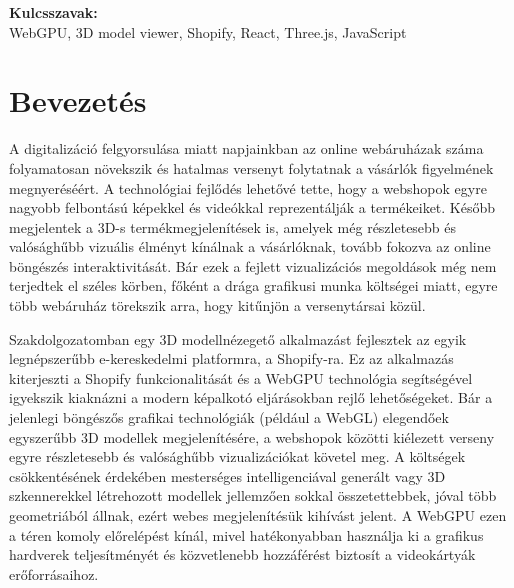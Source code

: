 \documentclass[12pt]{report}
\newcommand{\tartalmi}[1]{%
  \vspace{1em}%
  \noindent\textbf{#1:}\\%
}
\begin{document}
        \tartalmi{Kulcsszavak}
        WebGPU, 3D model viewer, Shopify, React, Three.js, JavaScript
            
        \newpage
        \tableofcontents

	
        \chapter*{Bevezetés}

        
        
        A digitalizáció felgyorsulása miatt napjainkban az online webáruházak száma folyamatosan növekszik és hatalmas versenyt folytatnak a vásárlók figyelmének megnyeréséért. A technológiai fejlődés lehetővé tette, hogy a webshopok egyre nagyobb felbontású képekkel és videókkal reprezentálják a termékeiket. Később megjelentek a 3D-s termékmegjelenítések is, amelyek még részletesebb és valósághűbb vizuális élményt kínálnak a vásárlóknak, tovább fokozva az online böngészés interaktivitását.
        Bár ezek a fejlett vizualizációs megoldások még nem terjedtek el széles körben, főként a drága grafikusi munka költségei miatt, egyre több webáruház törekszik arra, hogy kitűnjön a versenytársai közül.
        
        Szakdolgozatomban egy 3D modellnézegető alkalmazást fejlesztek az egyik legnépszerűbb e-kereskedelmi platformra, a Shopify-ra. Ez az alkalmazás kiterjeszti a Shopify funkcionalitását és a WebGPU technológia segítségével igyekszik kiaknázni a modern képalkotó eljárásokban rejlő lehetőségeket. Bár a jelenlegi böngészős grafikai technológiák (például a WebGL) elegendőek egyszerűbb 3D modellek megjelenítésére, a webshopok közötti kiélezett verseny egyre részletesebb és valósághűbb vizualizációkat követel meg. A költségek csökkentésének érdekében mesterséges intelligenciával generált vagy 3D szkennerekkel létrehozott modellek jellemzően sokkal összetettebbek, jóval több geometriából állnak, ezért webes megjelenítésük kihívást jelent. A WebGPU ezen a téren komoly előrelépést kínál, mivel hatékonyabban használja ki a grafikus hardverek teljesítményét és közvetlenebb hozzáférést biztosít a videokártyák erőforrásaihoz.
        
\end{document}
